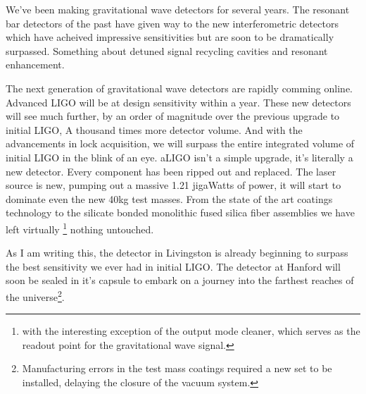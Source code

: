 

%

We've been making gravitational wave detectors for several years.
The resonant bar detectors of the past have given way to the new
interferometric detectors which have acheived impressive sensitivities
but are soon to be dramatically surpassed.
Something about detuned signal recycling cavities and resonant enhancement.

The next generation of gravitational wave detectors are rapidly comming
online.
Advanced LIGO will be at design sensitivity within a year.
These new detectors will see much further, by an order of magnitude over
the previous upgrade to initial LIGO,
A thousand times more detector volume.
And with the advancements in lock acquisition, we will surpass the entire
integrated volume of initial LIGO in the blink of an eye.
aLIGO isn't a simple upgrade, it's literally a new detector.
Every component has been ripped out and replaced.
The laser source is new, pumping out a massive 1.21 jigaWatts of power,
it will start to dominate even the new 40kg test masses.
From the state of the art coatings technology to the silicate bonded
monolithic fused silica fiber assemblies we have left virtually
\footnote{with the interesting exception of the output mode cleaner, which
serves as the readout point for the gravitational wave signal.}
nothing untouched.

As I am writing this,
the detector in Livingston is already beginning to surpass the
best sensitivity we ever had in initial LIGO. The detector at Hanford will
soon be sealed in it's capsule to embark on a journey into the farthest
reaches of the
universe\footnote{Manufacturing errors in the test mass coatings required a new
set to be installed, delaying the closure of the vacuum system.}.

